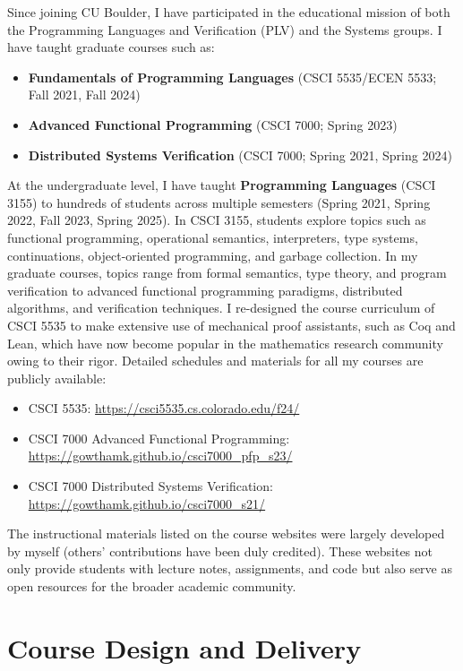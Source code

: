Since joining CU Boulder, I have participated in the educational mission of both the Programming Languages and Verification (PLV) and the Systems groups. I have taught graduate courses such as:
\begin{itemize}
    \item \textbf{Fundamentals of Programming Languages} (CSCI 5535/ECEN 5533; Fall 2021, Fall 2024)
    \item \textbf{Advanced Functional Programming} (CSCI 7000; Spring 2023)
    \item \textbf{Distributed Systems Verification} (CSCI 7000; Spring 2021, Spring 2024)
\end{itemize}
At the undergraduate level, I have taught \textbf{Programming Languages}
(CSCI 3155) to hundreds of students across multiple semesters (Spring 2021,
Spring 2022, Fall 2023, Spring 2025). In CSCI 3155, students explore topics
such as functional programming, operational semantics, interpreters, type
systems, continuations, object-oriented programming, and garbage
collection. In my graduate courses, topics range from formal semantics,
type theory, and program verification to advanced functional programming
paradigms, distributed algorithms, and verification techniques. I
re-designed the course curriculum of CSCI 5535 to make extensive use of
mechanical proof assistants, such as Coq and Lean, which have now become
popular in the mathematics research community owing to their rigor.
Detailed schedules and materials for all my courses are publicly available:
\begin{itemize}
    \item CSCI 5535: \url{https://csci5535.cs.colorado.edu/f24/}
    \item CSCI 7000 Advanced Functional Programming: \url{https://gowthamk.github.io/csci7000_pfp_s23/}
    \item CSCI 7000 Distributed Systems Verification: \url{https://gowthamk.github.io/csci7000_s21/}
\end{itemize}

The instructional materials listed on the course websites were largely
developed by myself (others' contributions have been duly credited). These
websites not only provide students with lecture notes, assignments, and
code but also serve as open resources for the broader academic community.

\section*{Course Design and Delivery}


